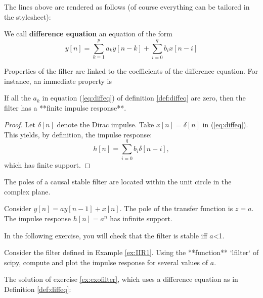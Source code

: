\documentclass[11pt]{article}
\begin{document}
    The lines above are rendered as follows (of course everything can be
tailored in the stylesheet):

\begin{definition} \label{def:diffeq}
We call \textbf{difference equation} an equation of the form
\begin{equation}
\label{eq:diffeq}
y[n]= \sum_{k=1}^{p} a_k y[n-k] + \sum_{i=0}^q b_i x[n-i]
\end{equation}
\end{definition}

Properties of the filter are linked to the coefficients of the
difference equation. For instance, an immediate property is

\begin{property}
If all the $a_k$ in equation (\ref{eq:diffeq}) of definition \ref{def:diffeq} are zero, then the filter has a **finite impulse response**. 
\end{property}

\begin{proof}
Let $\delta[n]$ denote the Dirac impulse. Take $x[n]=\delta[n]$ in (\ref{eq:diffeq}). This yields, by definition, the impulse response:
\begin{equation}
\label{eq:fir}
h[n]= \sum_{i=0}^q b_i \delta[n-i],
\end{equation}
which has finite support. 
\end{proof}

\begin{theorem}
The poles of a causal stable filter are located within the unit circle in the complex plane.
\end{theorem}

\begin{example} \label{ex:IIR1}
Consider $y[n]= a y[n-1] +  x[n]$. The pole of the transfer function is $z=a$. The impulse response $h[n]=a^n$ has infinite support.
\end{example}

In the following exercise, you will check that the filter is stable iff
\(a\)\textless{}1.

\begin{exercise}\label{ex:exofilter}
Consider the filter defined in Example \ref{ex:IIR1}. Using the **function** `lfilter` of scipy, compute and plot the impulse response for several values of $a$.
\end{exercise}

    \begin{listing}
The solution of exercise \ref{ex:exofilter}, which uses a difference equation as in Definition \ref{def:diffeq}:
\end{listing}
\end{document}
